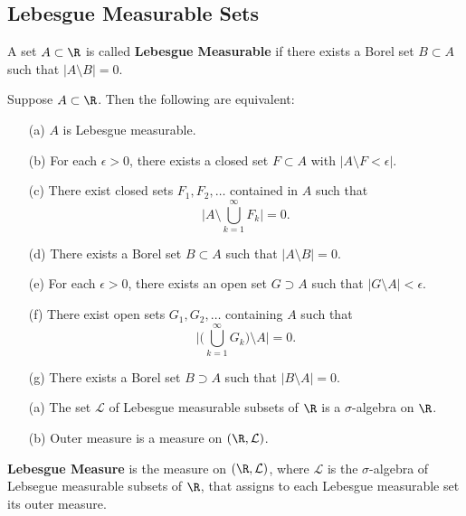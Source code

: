 \subsection{Lebesgue Measurable Sets}

\begin{definition}
    A set \( A \subset \R  \) is called \textbf{Lebesgue Measurable} if there exists a Borel set \( B \subset A  \) such that \( | A \setminus  B   | = 0  \).
\end{definition}

\begin{prop}
   Suppose \( A \subset \R  \). Then the following are equivalent: 
   \begin{enumerate}
       \item[(a)] \( A  \) is Lebesgue measurable.
       \item[(b)] For each \( \epsilon > 0  \), there exists a closed set \( F \subset A  \) with \( | A \setminus  F  < \epsilon |  \). 
        \item[(c)] There exist closed sets \( {F}_{1}, {F}_{2}, \dots  \) contained in \( A  \) such that 
            \[  \Big| A \setminus \bigcup_{ k=1  }^{ \infty  }  {F}_{k}   \Big| = 0. \]
        \item[(d)] There exists a Borel set \( B \subset A  \) such that \( | A \setminus  B   |  = 0 \).
        \item[(e)] For each \( \epsilon > 0  \), there exists an open set \( G \supset A  \) such that \( | G \setminus  A  | < \epsilon. \)
        \item[(f)] There exist open sets \( {G}_{1}, {G}_{2}, \dots  \) containing \( A  \) such that \[ \Big| \Big(  \bigcup_{ k=1  }^{ \infty  }  {G}_{k} \Big)\setminus  A  \Big| = 0.  \]
        \item[(g)] There exists a Borel set \( B \supset A  \) such that \( | B \setminus  A   |= 0 \).
   \end{enumerate}
\end{prop}

\begin{prop}
    \begin{enumerate}
        \item[(a)] The set \( \mathcal{L} \) of Lebesgue measurable subsets of \( \R  \) is a \( \sigma \)-algebra on \( \R  \).
        \item[(b)] Outer measure is a measure on \( (\R , \mathcal{L}) \).
    \end{enumerate}
\end{prop}

\begin{definition}
    \textbf{Lebesgue Measure} is the measure on \( (\R , \mathcal{L}) \), where \( \mathcal{L} \) is the \( \sigma \)-algebra of Lebsegue measurable subsets of \( \R  \), that assigns to each Lebesgue measurable set its outer measure.
\end{definition}
